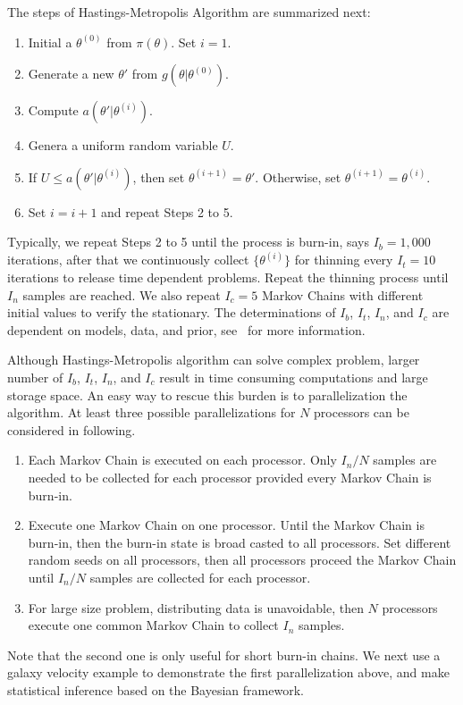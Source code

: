 The steps of Hastings-Metropolis Algorithm are summarized next:
\begin{enumerate}[label=Step \arabic*:]
\item Initial a $\theta^{(0)}$ from $\pi(\theta)$. Set $i = 1$.

\item Generate a new $\theta'$ from $g(\theta | \theta^{(0)})$.

\item Compute $a(\theta' | \theta^{(i)})$.

\item Genera a uniform random variable $U$.

\item If $U \leq a(\theta' | \theta^{(i)})$, then set
      $\theta^{(i + 1)} = \theta'$. Otherwise, set
      $\theta^{(i + 1)} = \theta^{(i)}$.

\item Set $i = i + 1$ and repeat Steps 2 to 5.
\end{enumerate}
Typically, we repeat Steps 2 to 5 until the process is burn-in, says
$I_b = 1,000$ iterations, after that we continuously collect $\{\theta^{(i)}\}$
for thinning every $I_t = 10$ iterations to release time dependent problems.
Repeat the thinning process until $I_n$ samples are reached. We also repeat
$I_c = 5$ Markov Chains with different initial values to verify the stationary.
The determinations of $I_b$, $I_t$, $I_n$,  and $I_c$ are dependent on models,
data, and prior, see~\citet{winbugs} for more information.

Although Hastings-Metropolis algorithm can solve complex problem, larger
number of $I_b$, $I_t$, $I_n$, and $I_c$ result in time consuming
computations and large storage space. An easy way to rescue this burden is to
parallelization the algorithm. At least three possible parallelizations for $N$
processors can be considered in following.
\begin{enumerate}
\item Each Markov Chain is executed on each processor.
      Only $I_n / N$ samples are needed to be collected for each processor
      provided every Markov Chain is burn-in.
\item Execute one Markov Chain on one processor. Until the Markov Chain
      is burn-in, then the burn-in state is broad casted to all processors.
      Set different random seeds on all processors, then all processors
      proceed the Markov Chain until $I_n / N$ samples are collected for each
      processor.
\item For large size problem, distributing data is unavoidable, then $N$
      processors execute one common Markov Chain to collect $I_n$ samples.
\end{enumerate}
Note that the second one is only useful for short burn-in chains.
We next use a galaxy velocity example to demonstrate the first
parallelization above, and make statistical inference based on the
Bayesian framework.




